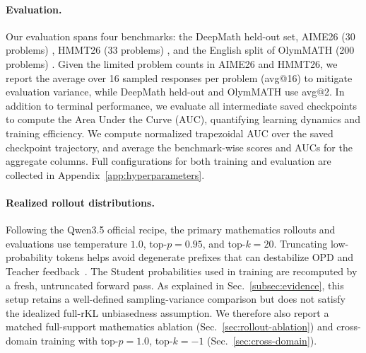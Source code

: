 \paragraph{Evaluation.}
Our evaluation spans four benchmarks: the DeepMath held-out set, AIME26 (30 problems) \citep{aime26}, HMMT26 (33 problems) \citep{dekoninck2026matharena}, and the English split of OlymMATH (200 problems) \citep{sun2025challengingboundariesreasoningolympiadlevel}. Given the limited problem counts in AIME26 and HMMT26, we report the average over 16 sampled responses per problem (avg@16) to mitigate evaluation variance, while DeepMath held-out and OlymMATH use avg@2. In addition to terminal performance, we evaluate all intermediate saved checkpoints to compute the Area Under the Curve (AUC), quantifying learning dynamics and training efficiency. We compute normalized trapezoidal AUC over the saved checkpoint
trajectory, and average the benchmark-wise scores and AUCs for the aggregate
columns. Full configurations for both training and evaluation are collected in
Appendix~\ref{app:hyperparameters}.
\vspace{-4mm}

\paragraph{Realized rollout distributions.}
Following the Qwen3.5 official recipe, the primary mathematics rollouts and evaluations
use temperature $1.0$, top-$p=0.95$, and top-$k=20$.
Truncating low-probability tokens helps avoid degenerate prefixes that can
destabilize OPD and Teacher feedback~\citep{fu2026revisiting}.
The Student probabilities used in training are recomputed by a fresh,
untruncated forward pass. As explained in Sec.~\ref{subsec:evidence}, this
setup retains a well-defined sampling-variance comparison but does not
satisfy the idealized full-rKL unbiasedness assumption.
We therefore also report a matched full-support mathematics ablation
(Sec.~\ref{sec:rollout-ablation}) and cross-domain training with
top-$p=1.0$, top-$k=-1$ (Sec.~\ref{sec:cross-domain}).

